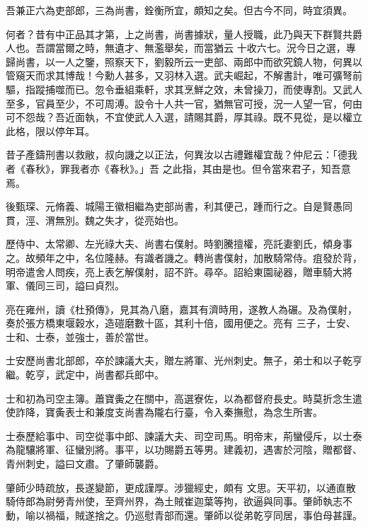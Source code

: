 \begin{pinyinscope}
 吾兼正六為吏部郎，三為尚書，銓衡所宜，頗知之矣。但古今不同，時宜須異。



 何者？昔有中正品其才第，上之尚書，尚書據狀，量人授職，此乃與天下群賢共爵人也。吾謂當爾之時，無遺才、無濫舉矣，而當猶云
 十收六七。況今日之選，專歸尚書，以一人之鑒，照察天下，劉毅所云一吏部、兩郎中而欲究鏡人物，何異以管窺天而求其博哉！今勳人甚多，又羽林入選。武夫崛起，不解書計，唯可彍弩前驅，指蹤捕噬而已。忽令垂組乘軒，求其烹鮮之效，未曾操刀，而使專割。又武人至多，官員至少，不可周溥。設令十人共一官，猶無官可授，況一人望一官，何由可不怨哉？吾近面執，不宜使武人入選，請賜其爵，厚其祿。既不見從，是以權立此格，限以停年耳。



 昔子產鑄刑書以救敝，叔向譏之以正法，何異汝以古禮難權宜哉？仲尼云：「德我者《春秋》，罪我者亦《春秋》。」吾
 之此指，其由是也。但令當來君子，知吾意焉。



 後甄琛、元脩義、城陽王徽相繼為吏部尚書，利其便己，踵而行之。自是賢愚同貫，涇、渭無別。魏之失才，從亮始也。



 歷侍中、太常卿、左光祿大夫、尚書右僕射。時劉騰擅權，亮託妻劉氏，傾身事之。故頻年之中，名位隆赫。有識者譏之。轉尚書僕射，加散騎常侍。疽發於背，明帝遣舍人問疾，亮上表乞解僕射，詔不許。尋卒。詔給東園祕器，贈車騎大將軍、儀同三司，謚曰貞烈。



 亮在雍州，讀《杜預傳》，見其為八磨，嘉其有濟時用，遂教人為碾。及為僕射，奏於張方橋東堰穀水，造磑磨數十區，其利十倍，國用便之。亮有
 三子，士安、士和、士泰，並強士，善於當世。



 士安歷尚書北部郎，卒於諫議大夫，贈左將軍、光州刺史。無子，弟士和以子乾亨繼。乾亨，武定中，尚書都兵郎中。



 士和初為司空主簿。蕭寶夤之在關中，高選寮佐，以為都督府長史。時莫折念生遣使詐降，寶夤表士和兼度支尚書為隴右行臺，令入秦撫慰，為念生所害。



 士泰歷給事中、司空從事中郎、諫議大夫、司空司馬。明帝末，荊蠻侵斥，以士泰為龍驤將軍、征蠻別將。事平，以功賜爵五等男。建義初，遇害於河陰，贈都督、青州刺史，謚曰文肅。了肇師襲爵。



 肇師少時疏放，長遂變節，更成謹厚。涉獵經史，頗有
 文思。天平初，以通直散騎侍郎為尉勞青州使，至齊州界，為土賊崔迦葉等拘，欲逼與同事。肇師執志不動，喻以禍福，賊遂捨之。仍巡慰青部而還。肇師以從弟乾亨同居，事伯母甚謹。




\end{pinyinscope}
